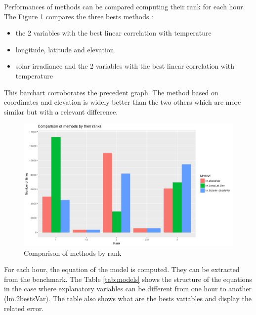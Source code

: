 \documentclass[12pt,twoside]{reedthesis}
\providecommand{\tightlist}{%
  \setlength{\itemsep}{0pt}\setlength{\parskip}{0pt}}
\theoremstyle{definition}
\theoremstyle{definition}
\theoremstyle{definition}
\theoremstyle{remark}
\begin{document}
Performances of methods can be compared computing their rank for each
hour. The Figure \ref{fig:barchart} compares the three bests methods :
\begin{itemize}
\tightlist
\item
  the 2 variables with the best linear correlation with temperature
\item
  longitude, latitude and elevation
\item
  solar irradiance and the 2 variables with the best linear correlation
  with temperature
\end{itemize}
This barchart corroborates the precedent graph. The method based on
coordinates and elevation is widely better than the two others which are
more similar but with a relevant difference.
\begin{figure}

{\centering \includegraphics[width=0.9\linewidth]{figure/barchart} 

}

\caption{Comparison of methods by rank}\label{fig:barchart}
\end{figure}
For each hour, the equation of the model is computed. They can be
extracted from the benchmark. The Table \ref{tab:models} shows the
structure of the equations in the case where explanatory variables can
be different from one hour to another (lm.2bestsVar). The table also
shows what are the bests variables and display the related error.
\end{document}
